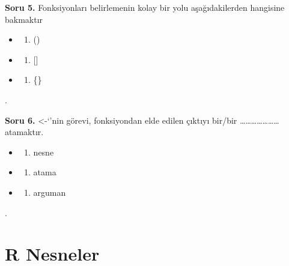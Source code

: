 \documentclass[
  oneside]{book}
\providecommand{\tightlist}{%
  \setlength{\itemsep}{0pt}\setlength{\parskip}{0pt}}
\begin{document}
\textbf{Soru 5.} Fonksiyonları belirlemenin kolay bir yolu aşağıdakilerden hangisine bakmaktır

\begin{itemize}
\item
  \begin{enumerate}
  \def\labelenumi{(\Alph{enumi})}
  \tightlist
  \item
    ()\\
  \end{enumerate}
\item
  \begin{enumerate}
  \def\labelenumi{(\Alph{enumi})}
  \setcounter{enumi}{1}
  \tightlist
  \item
    {[}{]}\\
  \end{enumerate}
\item
  \begin{enumerate}
  \def\labelenumi{(\Alph{enumi})}
  \setcounter{enumi}{2}
  \tightlist
  \item
    \{\}
  \end{enumerate}
\end{itemize}

.

\textbf{Soru 6.} \textless-`'nin görevi, fonksiyondan elde edilen çıktıyı bir/bir \ldots\ldots\ldots\ldots\ldots\ldots\ldots{} atamaktır.

\begin{itemize}
\item
  \begin{enumerate}
  \def\labelenumi{(\Alph{enumi})}
  \tightlist
  \item
    nesne\\
  \end{enumerate}
\item
  \begin{enumerate}
  \def\labelenumi{(\Alph{enumi})}
  \setcounter{enumi}{1}
  \tightlist
  \item
    atama\\
  \end{enumerate}
\item
  \begin{enumerate}
  \def\labelenumi{(\Alph{enumi})}
  \setcounter{enumi}{2}
  \tightlist
  \item
    arguman
  \end{enumerate}
\end{itemize}

.

\hypertarget{r-nesneler}{%
\chapter{R Nesneler}\label{r-nesneler}}
\end{document}
